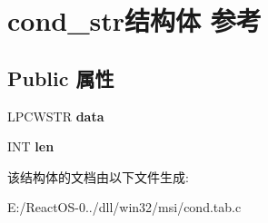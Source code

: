 \hypertarget{structcond__str}{}\section{cond\+\_\+str结构体 参考}
\label{structcond__str}
\subsection*{Public 属性}
\begin{DoxyCompactItemize}
\item 
\mbox{\label{structcond__str_a08f41b91dc45531d8b86c78c6396592d}} 
L\+P\+C\+W\+S\+TR {\bfseries data}
\item 
\mbox{\label{structcond__str_a7199e9bb85b0c61c762d76cfdf522c84}} 
I\+NT {\bfseries len}
\end{DoxyCompactItemize}


该结构体的文档由以下文件生成\+:\begin{DoxyCompactItemize}
\item 
E\+:/\+React\+O\+S-\/0../dll/win32/msi/cond.\+tab.\+c\end{DoxyCompactItemize}
